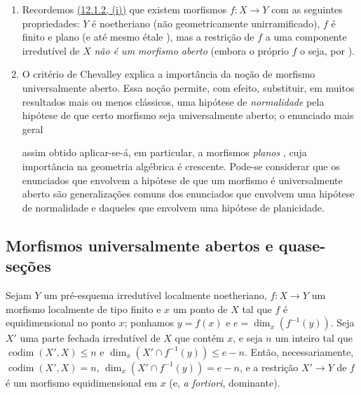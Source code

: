 \begin{remarks}[14.4.10]
\begin{enumerate}[label=(\roman*)]
  Recordemos, contudo,  que, se $Y$ é localmente noetheriano e $f:X\to Y$ é de tipo finito e \emph{plano}, então toda componente irredutível de $X$ é \emph{equidimensional} sobre $Y$ (e, por conseguinte, a restrição de $f$ a tal componente é \emph{universalmente aberta} se todos os pontos de $Y$ são \emph{geometricamente unirramificados}).

  \item Recordemos \hyperlink{ega4.c04.item.12-1-2}{(12.1.2, (i))} que existem morfismos $f:X\to Y$ com as seguintes propriedades: $Y$ é noetheriano (não geometricamente unirramificado), $f$ é finito e plano (e até mesmo étale ), mas a restrição de $f$ a uma componente irredutível de $X$ \emph{não é um morfismo aberto} (embora o próprio $f$ o seja, por ).

  \item O critério de Chevalley  explica a importância da noção de morfismo universalmente aberto.
  Essa noção permite, com efeito, substituir, em muitos resultados mais ou menos clássicos, uma hipótese de \emph{normalidade} pela hipótese de que certo morfismo seja universalmente aberto; o enunciado mais geral


  assim obtido aplicar-se-á, em particular, a morfismos \emph{planos} , cuja importância na geometria algébrica é crescente.
  Pode-se considerar que os enunciados que envolvem a hipótese de que um morfismo é universalmente aberto são generalizações comuns dos enunciados que envolvem uma hipótese de normalidade e daqueles que envolvem uma hipótese de planicidade.
\end{enumerate}
\end{remarks}

\subsection{Morfismos universalmente abertos e quase-seções}
\label{subsection:IV.14.5}

\begin{lemma}[14.5.1]
\label{IV.14.5.1}
Sejam $Y$ um pré-esquema irredutível localmente noetheriano, $f:X\to Y$ um morfismo localmente de tipo finito e $x$ um ponto de $X$ tal que $f$ é equidimensional  no ponto $x$; ponhamos $y=f(x)$ e $e=\dim_x(f^{-1}(y))$.
Seja $X'$ uma parte fechada irredutível de $X$ que contém $x$, e seja $n$ um inteiro tal que $\operatorname{codim}(X',X)\leq n$ e $\dim_x(X'\cap f^{-1}(y))\leq e-n$.
Então, necessariamente, $\operatorname{codim}(X',X)=n$, $\dim_x(X'\cap f^{-1}(y))=e-n$, e a restrição $X'\to Y$ de $f$ é um morfismo equidimensional em $x$ (e, \emph{a fortiori}, dominante).
\end{lemma}

